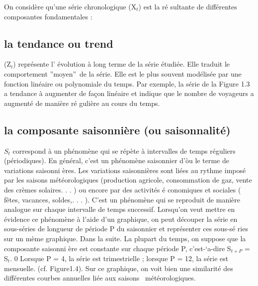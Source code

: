 \documentclass[a4paper,12pt,freqn]{report}
\theoremstyle{plain}
\begin{document}
On consid\`{e}re qu'une s\'{e}rie chronologique (X$_{t}$) est la r\'{e}%
sultante de diff\'{e}rentes composantes fondamentales :

\bigskip

\subsection{  la tendance ou trend}
 (Z$_{t}$) repr\'{e}sente l'%
\'{e}volution \`{a} long terme de la s\'{e}rie \'{e}tudi\'{e}e. Elle traduit le
comportement \textquotedblright moyen\textquotedblright\ de la s\'{e}rie. Elle est le plus souvent mod\'{e}lis\'{e}e par une fonction lin\'{e}aire ou
polynomiale du temps.
Par exemple, la s\'{e}rie de la Figure 1.3 a tendance \`{a} augmenter de fa\c{c}on
lin\'{e}aire et indique que le nombre de voyageurs a augment\'{e} de mani\`{e}re r\'{e}%
guli\`{e}re au cours du temps.

\bigskip

\subsection{la composante saisonni\`{e}re (ou saisonnalit\'{e})}


$S_{t}$ correspond \`{a} un ph\'{e}nom\`{e}ne qui se r\'{e}p\`{e}te \`{a}
intervalles de temps r\'{e}guliers (p\'{e}riodiques). En g\'{e}n\'{e}ral,
c'est un ph\'{e}nom\`{e}ne saisonnier d'\`{o}u le terme de variations saisonni%
\`{e}res.
Les variations saisonni\`{e}res sont li\'{e}es au rythme impos\'{e} par les
saisons m\'{e}t\'{e}orologiques (production agricole, consommation de gaz,
vente des cr\`{e}mes solaires. . . ) ou encore par des activit\'{e}s \'{e}%
conomiques et sociales ( f\^{e}tes, vacances, soldes,. . . ).
 C'est un ph\'{e}nom\`{e}ne qui
se reproduit de mani\`{e}re analogue sur chaque intervalle de temps
successif. Lorsqu'on veut mettre en \'{e}vidence ce ph\'{e}nom\`{e}ne \`{a}
l'aide d'un graphique, on peut d\'{e}couper la s\'{e}rie en sous-s\'{e}ries
de longueur de p\'{e}riode P du saisonnier et repr\'{e}senter ces sous-s\'{e}%
ries sur un m\`{e}me graphique. Dans la suite. La plupart du temps, on suppose que la composante saisonni%
\`{e}re est constante sur chaque p\'{e}riode P, c'est-`a-dire S$_{t+P}$ = S$%
_{t}$.
0
Lorsque P = 4, la s\'{e}rie est trimestrielle ; lorsque P = 12, la s\'{e}rie
est mensuelle. (cf. Figure1.4). Sur ce
graphique, on voit bien une similarit\'{e} des diff\'{e}rentes courbes
annuelles li\'{e}e aux saisons \ m\'{e}t\'{e}orologiques.\\
\end{document}

